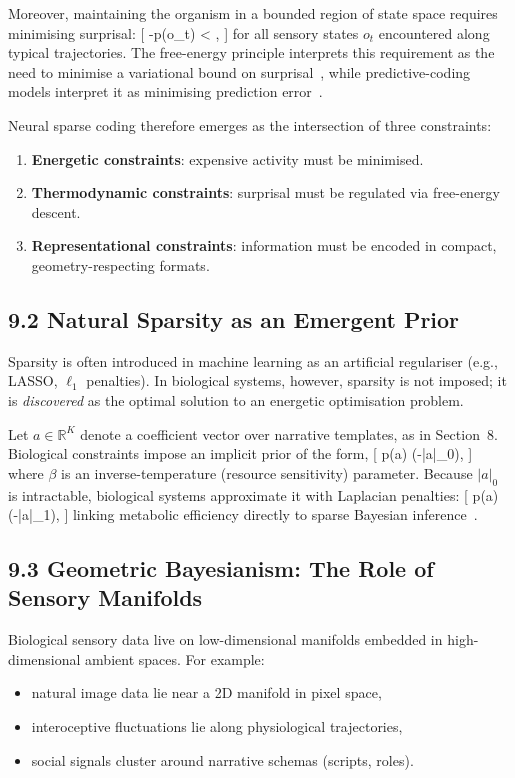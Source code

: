\documentclass[11pt,a4paper,twoside]{article}
\begin{document}
Moreover, maintaining the organism in a bounded region of state space requires minimising surprisal:
[
-\ln p(o_t) < \infty,
]
for all sensory states $o_t$ encountered along typical trajectories. The free-energy principle interprets this requirement as the need to minimise a variational bound on surprisal~\cite{friston2010free}, while predictive-coding models interpret it as minimising prediction error~\cite{bogacz2017}.

Neural sparse coding therefore emerges as the intersection of three constraints:
\begin{enumerate}
\item \textbf{Energetic constraints}: expensive activity must be minimised.
\item \textbf{Thermodynamic constraints}: surprisal must be regulated via free-energy descent.
\item \textbf{Representational constraints}: information must be encoded in compact, geometry-respecting formats.
\end{enumerate}

\subsection{9.2 Natural Sparsity as an Emergent Prior}

Sparsity is often introduced in machine learning as an artificial regulariser (e.g., LASSO, $\ell_1$ penalties). In biological systems, however, sparsity is not imposed; it is \emph{discovered} as the optimal solution to an energetic optimisation problem.

Let $a\in\mathbb{R}^K$ denote a coefficient vector over narrative templates, as in Section~8. Biological constraints impose an implicit prior of the form,
[
p(a) \propto \exp\left(-\beta |a|_0\right),
]
where $\beta$ is an inverse-temperature (resource sensitivity) parameter. Because $|a|_0$ is intractable, biological systems approximate it with Laplacian penalties:
[
p(a) \approx \exp\left(-\lambda |a|_1\right),
]
linking metabolic efficiency directly to sparse Bayesian inference~\cite{donoho2006compressed,elad2010sparse}.

\subsection{9.3 Geometric Bayesianism: The Role of Sensory Manifolds}

Biological sensory data live on low-dimensional manifolds embedded in high-dimensional ambient spaces. For example:
\begin{itemize}
\item natural image data lie near a 2D manifold in pixel space,
\item interoceptive fluctuations lie along physiological trajectories,
\item social signals cluster around narrative schemas (scripts, roles).
\end{itemize}
\end{document}
